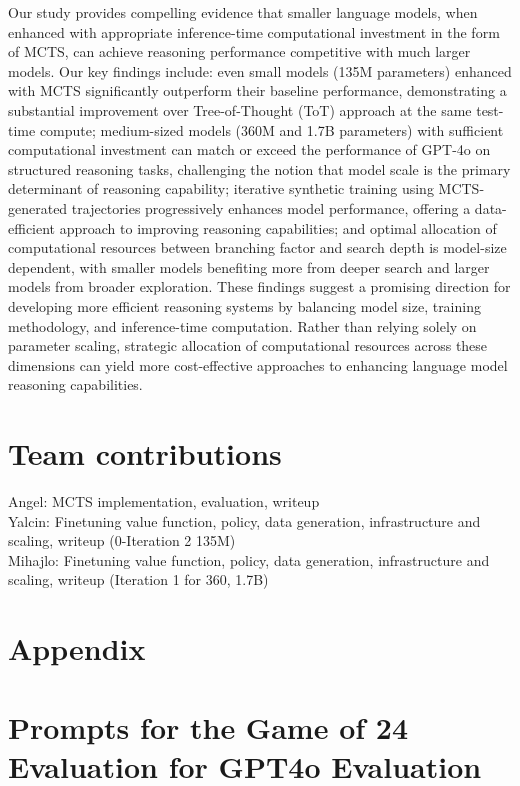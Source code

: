 \documentclass{article}
\begin{document}
Our study provides compelling evidence that smaller language models, when enhanced with appropriate inference-time computational investment in the form of MCTS, can achieve reasoning performance competitive with much larger models. Our key findings include: even small models (135M parameters) enhanced with MCTS significantly outperform their baseline performance, demonstrating a substantial improvement over Tree-of-Thought (ToT) approach at the same test-time compute; medium-sized models (360M and 1.7B parameters) with sufficient computational investment can match or exceed the performance of GPT-4o on structured reasoning tasks, challenging the notion that model scale is the primary determinant of reasoning capability; iterative synthetic training using MCTS-generated trajectories progressively enhances model performance, offering a data-efficient approach to improving reasoning capabilities; and optimal allocation of computational resources between branching factor and search depth is model-size dependent, with smaller models benefiting more from deeper search and larger models from broader exploration. These findings suggest a promising direction for developing more efficient reasoning systems by balancing model size, training methodology, and inference-time computation. Rather than relying solely on parameter scaling, strategic allocation of computational resources across these dimensions can yield more cost-effective approaches to enhancing language model reasoning capabilities.




\newpage
\section*{Team contributions}
Angel: MCTS implementation, evaluation, writeup \\
Yalcin: Finetuning value function, policy, data generation, infrastructure and scaling, writeup (0-Iteration 2 135M) \\ 
Mihajlo: Finetuning value function, policy, data generation, infrastructure and scaling, writeup (Iteration 1 for 360, 1.7B)



\clearpage
\appendix

\section{Appendix}\label{Appendix}
\appendix
\section{Prompts for the Game of 24 Evaluation for GPT4o Evaluation}
\end{document}
